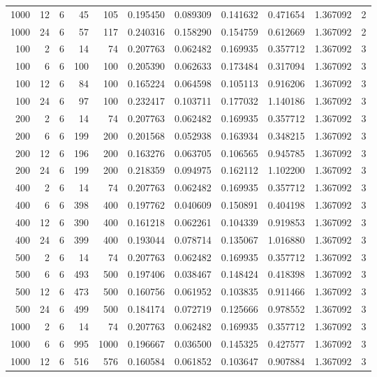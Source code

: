 \begin{table}
\begin{tabular}{rrrrrrrrrrr}
1000 & 12 & 6 & 45 & 105 & 0.195450 & 0.089309 & 0.141632 & 0.471654 & 1.367092 & 2 \\
1000 & 24 & 6 & 57 & 117 & 0.240316 & 0.158290 & 0.154759 & 0.612669 & 1.367092 & 2 \\
100 & 2 & 6 & 14 & 74 & 0.207763 & 0.062482 & 0.169935 & 0.357712 & 1.367092 & 3 \\
100 & 6 & 6 & 100 & 100 & 0.205390 & 0.062633 & 0.173484 & 0.317094 & 1.367092 & 3 \\
100 & 12 & 6 & 84 & 100 & 0.165224 & 0.064598 & 0.105113 & 0.916206 & 1.367092 & 3 \\
100 & 24 & 6 & 97 & 100 & 0.232417 & 0.103711 & 0.177032 & 1.140186 & 1.367092 & 3 \\
200 & 2 & 6 & 14 & 74 & 0.207763 & 0.062482 & 0.169935 & 0.357712 & 1.367092 & 3 \\
200 & 6 & 6 & 199 & 200 & 0.201568 & 0.052938 & 0.163934 & 0.348215 & 1.367092 & 3 \\
200 & 12 & 6 & 196 & 200 & 0.163276 & 0.063705 & 0.106565 & 0.945785 & 1.367092 & 3 \\
200 & 24 & 6 & 199 & 200 & 0.218359 & 0.094975 & 0.162112 & 1.102200 & 1.367092 & 3 \\
400 & 2 & 6 & 14 & 74 & 0.207763 & 0.062482 & 0.169935 & 0.357712 & 1.367092 & 3 \\
400 & 6 & 6 & 398 & 400 & 0.197762 & 0.040609 & 0.150891 & 0.404198 & 1.367092 & 3 \\
400 & 12 & 6 & 390 & 400 & 0.161218 & 0.062261 & 0.104339 & 0.919853 & 1.367092 & 3 \\
400 & 24 & 6 & 399 & 400 & 0.193044 & 0.078714 & 0.135067 & 1.016880 & 1.367092 & 3 \\
500 & 2 & 6 & 14 & 74 & 0.207763 & 0.062482 & 0.169935 & 0.357712 & 1.367092 & 3 \\
500 & 6 & 6 & 493 & 500 & 0.197406 & 0.038467 & 0.148424 & 0.418398 & 1.367092 & 3 \\
500 & 12 & 6 & 473 & 500 & 0.160756 & 0.061952 & 0.103835 & 0.911466 & 1.367092 & 3 \\
500 & 24 & 6 & 499 & 500 & 0.184174 & 0.072719 & 0.125666 & 0.978552 & 1.367092 & 3 \\
1000 & 2 & 6 & 14 & 74 & 0.207763 & 0.062482 & 0.169935 & 0.357712 & 1.367092 & 3 \\
1000 & 6 & 6 & 995 & 1000 & 0.196667 & 0.036500 & 0.145325 & 0.427577 & 1.367092 & 3 \\
1000 & 12 & 6 & 516 & 576 & 0.160584 & 0.061852 & 0.103647 & 0.907884 & 1.367092 & 3 \\

\end{tabular}
\end{table}
